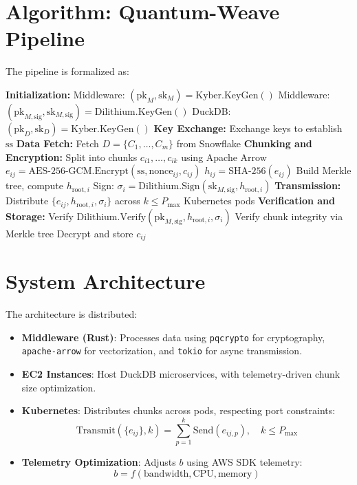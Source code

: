 \documentclass[12pt]{article}
\begin{document}
\section{Algorithm: Quantum-Weave Pipeline}
The pipeline is formalized as:
\begin{algorithmic}[1]
    \State \textbf{Initialization:}
        \State Middleware: \( (\text{pk}_M, \text{sk}_M) = \text{Kyber.KeyGen}() \)
        \State Middleware: \( (\text{pk}_{M,\text{sig}}, \text{sk}_{M,\text{sig}}) = \text{Dilithium.KeyGen}() \)
        \State DuckDB: \( (\text{pk}_D, \text{sk}_D) = \text{Kyber.KeyGen}() \)
    \State \textbf{Key Exchange:}
        \State Exchange keys to establish \(\text{ss}\)
    \State \textbf{Data Fetch:}
        \State Fetch \( D = \{C_1, \dots, C_m\} \) from Snowflake
    \State \textbf{Chunking and Encryption:}
            \State Split into chunks \( c_{i1}, \dots, c_{ik} \) using Apache Arrow
                \State \( e_{ij} = \text{AES-256-GCM.Encrypt}(\text{ss}, \text{nonce}_{ij}, c_{ij}) \)
                \State \( h_{ij} = \text{SHA-256}(e_{ij}) \)
            \EndFor
            \State Build Merkle tree, compute \( h_{\text{root},i} \)
            \State Sign: \( \sigma_i = \text{Dilithium.Sign}(\text{sk}_{M,\text{sig}}, h_{\text{root},i}) \)
        \EndFor
    \State \textbf{Transmission:}
        \State Distribute \( \{e_{ij}, h_{\text{root},i}, \sigma_i\} \) across \( k \leq P_{\max} \) Kubernetes pods
    \State \textbf{Verification and Storage:}
            \State Verify \( \text{Dilithium.Verify}(\text{pk}_{M,\text{sig}}, h_{\text{root},i}, \sigma_i) \)
            \State Verify chunk integrity via Merkle tree
            \State Decrypt and store \( c_{ij} \)
        \EndFor
\end{algorithmic}

\section{System Architecture}
The architecture is distributed:
\begin{itemize}
    \item \textbf{Middleware (Rust)}: Processes data using \texttt{pqcrypto} for cryptography, \texttt{apache-arrow} for vectorization, and \texttt{tokio} for async transmission.
    \item \textbf{EC2 Instances}: Host DuckDB microservices, with telemetry-driven chunk size optimization.
    \item \textbf{Kubernetes}: Distributes chunks across pods, respecting port constraints:
    \[
    \text{Transmit}(\{e_{ij}\}, k) = \sum_{p=1}^k \text{Send}(e_{ij,p}), \quad k \leq P_{\max}
    \]
    \item \textbf{Telemetry Optimization}: Adjusts \( b \) using AWS SDK telemetry:
    \[
    b = f(\text{bandwidth}, \text{CPU}, \text{memory})
    \]
\end{itemize}
\end{document}
